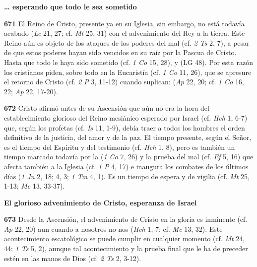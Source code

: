 \textbf{\ldots{} esperando que todo le sea sometido}

\textbf{671} El Reino de Cristo, presente ya en su Iglesia, sin embargo, no está todavía acabado  (\emph{Lc} 21, 27; cf. \emph{Mt} 25, 31) con el advenimiento del Rey a la tierra. Este Reino aún es objeto de los ataques de los poderes del mal (cf. \emph{2 Ts} 2, 7), a pesar de que estos poderes hayan sido vencidos en su raíz por la Pascua de Cristo. Hasta que todo le haya sido sometido (cf. \emph{1 Co} 15, 28), y  (LG 48). Por esta razón los cristianos piden, sobre todo en la Eucaristía (cf. \emph{1 Co} 11, 26), que se apresure el retorno de Cristo (cf. \emph{2 P} 3, 11-12) cuando suplican:  (\emph{Ap} 22, 20; cf. \emph{1 Co} 16, 22; \emph{Ap} 22, 17-20).



\textbf{672} Cristo afirmó antes de su Ascensión que aún no era la hora del establecimiento glorioso del Reino mesiánico esperado por Israel (cf. \emph{Hch} 1, 6-7) que, según los profetas (cf. \emph{Is} 11, 1-9), debía traer a todos los hombres el orden definitivo de la justicia, del amor y de la paz. El tiempo presente, según el Señor, es el tiempo del Espíritu y del testimonio (cf. \emph{Hch} 1, 8), pero es también un tiempo marcado todavía por la  (\emph{1 Co} 7, 26) y la prueba del mal (cf. \emph{Ef} 5, 16) que afecta también a la Iglesia (cf. \emph{1 P} 4, 17) e inaugura los combates de los últimos días (\emph{1 Jn} 2, 18; 4, 3; \emph{1 Tm} 4, 1). Es un tiempo de espera y de vigilia (cf. \emph{Mt} 25, 1-13; \emph{Mc} 13, 33-37).

\textbf{El glorioso advenimiento de Cristo, esperanza de Israel}

\textbf{673} Desde la Ascensión, el advenimiento de Cristo en la gloria es inminente (cf. \emph{Ap} 22, 20) aun cuando a nosotros no nos  (\emph{Hch} 1, 7; cf. \emph{Mc} 13, 32). Este acontecimiento escatológico se puede cumplir en cualquier momento (cf. \emph{Mt} 24, 44: \emph{1 Ts} 5, 2), aunque tal acontecimiento y la prueba final que le ha de preceder estén  en las manos de Dios (cf. \emph{2 Ts} 2, 3-12).

